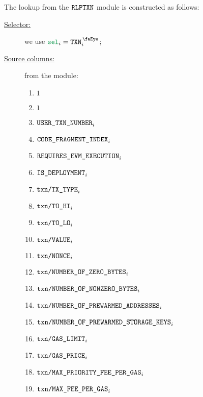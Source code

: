 The lookup from the $\texttt{RLPTXN}$ module is constructed as follows:
\begin{description}
	\item[\underline{Selector:}] we use $\loc{sel} _{i} = \isTxn _{i}$;
	\item[\underline{Source columns:}] from the \rlpTxnMod{} module:
		\begin{multicols}{2}
			\begin{enumerate}
				\item $1$
				\item $1$
				\item $\texttt{USER}\texttt{\_}\texttt{TXN\_NUMBER}                       _{i}$
				\item $\texttt{CODE\_FRAGMENT\_INDEX}                                         _{i}$
				\item $\texttt{REQUIRES\_EVM\_EXECUTION}      _{i}$
				\item $\texttt{IS\_DEPLOYMENT}                     _{i}$
				\item $\texttt{txn}\texttt{/}\texttt{{TX\_TYPE}}               _{i}$
				\item $\texttt{txn}\texttt{/}\texttt{{TO\_HI}}                 _{i}$
				\item $\texttt{txn}\texttt{/}\texttt{{TO\_LO}}                 _{i}$
				\item $\texttt{txn}\texttt{/}\texttt{{VALUE}}             _{i}$
				\item $\texttt{txn}\texttt{/}\texttt{{\texttt{NONCE}}}                _{i}$
				\item $\texttt{txn}\texttt{/}\texttt{{NUMBER\_OF\_ZERO\_BYTES}}         _{i}$
				\item $\texttt{txn}\texttt{/}\texttt{{NUMBER\_OF\_NONZERO\_BYTES}}      _{i}$
				\item $\texttt{txn}\texttt{/}\texttt{{NUMBER\_OF\_PREWARMED\_ADDRESSES}}      _{i}$
				\item $\texttt{txn}\texttt{/}\texttt{{NUMBER\_OF\_PREWARMED\_STORAGE\_KEYS}}   _{i}$
				\item $\texttt{txn}\texttt{/}\texttt{{GAS\_LIMIT}}             _{i}$
				\item $\texttt{txn}\texttt{/}\texttt{{GAS\_PRICE}}             _{i}$
				\item $\texttt{txn}\texttt{/}\texttt{{MAX\_PRIORITY\_FEE\_PER\_GAS}} _{i}$
				\item $\texttt{txn}\texttt{/}\texttt{{MAX\_FEE\_PER\_GAS}}         _{i}$
			\end{enumerate}
		\end{multicols}

\end{description}

